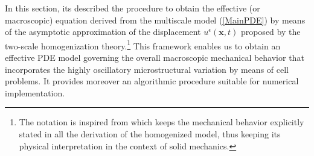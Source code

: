  In this section, its described the procedure to obtain the effective (or macroscopic) equation derived from the multiscale model (\ref{MainPDE}) by means of the asymptotic approximation of the displacement $u^{\epsilon}(\mathbf{x},t)$ proposed by the two-scale homogenization theory.\footnote{The notation is inspired from \cite{altenbach2018generalized} which keeps the mechanical behavior explicitly stated in all the derivation of the homogenized model, thus keeping its physical interpretation in the context of solid mechanics.} This framework enables us to obtain an effective PDE model governing the overall macroscopic mechanical behavior that incorporates the highly oscillatory microstructural variation by means of cell problems. It provides moreover an algorithmic procedure suitable for numerical implementation.

